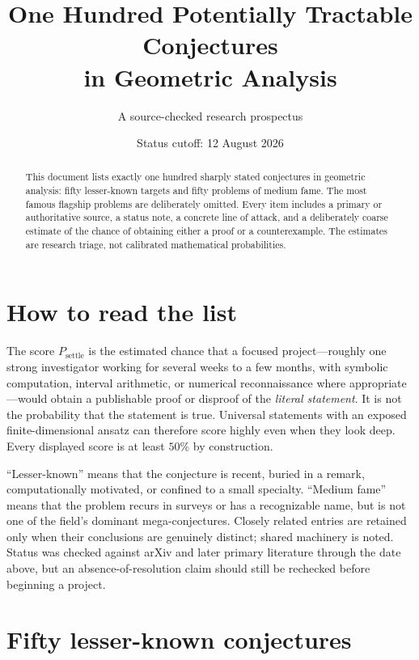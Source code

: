 \documentclass[11pt]{article}
\title{One Hundred Potentially Tractable Conjectures\\in Geometric Analysis}
\author{A source-checked research prospectus}
\date{Status cutoff: 12 August 2026}
\newcommand{\psettle}{P_{\mathrm{settle}}}
\begin{document}
\maketitle

\begin{abstract}
This document lists exactly one hundred sharply stated conjectures in geometric analysis: fifty lesser-known targets and fifty problems of medium fame.  The most famous flagship problems are deliberately omitted.  Every item includes a primary or authoritative source, a status note, a concrete line of attack, and a deliberately coarse estimate of the chance of obtaining either a proof or a counterexample.  The estimates are research triage, not calibrated mathematical probabilities.
\end{abstract}

\section*{How to read the list}

The score $\psettle$ is the estimated chance that a focused project---roughly one strong investigator working for several weeks to a few months, with symbolic computation, interval arithmetic, or numerical reconnaissance where appropriate---would obtain a publishable proof or disproof of the \emph{literal statement}.  It is not the probability that the statement is true.  Universal statements with an exposed finite-dimensional ansatz can therefore score highly even when they look deep.  Every displayed score is at least $50\%$ by construction.

``Lesser-known'' means that the conjecture is recent, buried in a remark, computationally motivated, or confined to a small specialty.  ``Medium fame'' means that the problem recurs in surveys or has a recognizable name, but is not one of the field's dominant mega-conjectures.  Closely related entries are retained only when their conclusions are genuinely distinct; shared machinery is noted.  Status was checked against arXiv and later primary literature through the date above, but an absence-of-resolution claim should still be rechecked before beginning a project.

\section{Fifty lesser-known conjectures}
\end{document}
